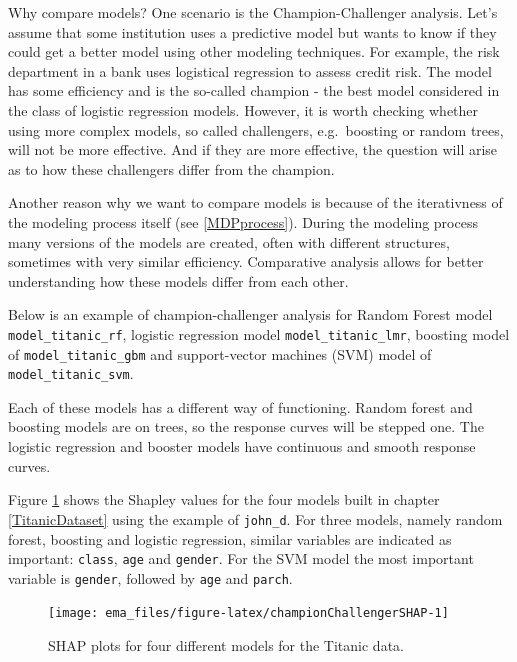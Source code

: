 \documentclass[12pt,]{krantz}
\begin{document}
Why compare models?
One scenario is the Champion-Challenger analysis. Let's assume that some institution uses a predictive model but wants to know if they could get a better model using other modeling techniques. For example, the risk department in a bank uses logistical regression to assess credit risk. The model has some efficiency and is the so-called champion - the best model considered in the class of logistic regression models.
However, it is worth checking whether using more complex models, so called challengers, e.g.~boosting or random trees, will not be more effective. And if they are more effective, the question will arise as to how these challengers differ from the champion.

Another reason why we want to compare models is because of the iterativness of the modeling process itself (see \ref{MDPprocess}). During the modeling process many versions of the models are created, often with different structures, sometimes with very similar efficiency. Comparative analysis allows for better understanding how these models differ from each other.

Below is an example of champion-challenger analysis for Random Forest model \texttt{model\_titanic\_rf}, logistic regression model \texttt{model\_titanic\_lmr}, boosting model of \texttt{model\_titanic\_gbm} and support-vector machines (SVM) model of \texttt{model\_titanic\_svm}.

Each of these models has a different way of functioning. Random forest and boosting models are on trees, so the response curves will be stepped one. The logistic regression and booster models have continuous and smooth response curves.

Figure \ref{fig:championChallengerSHAP} shows the Shapley values for the four models built in chapter \ref{TitanicDataset} using the example of \texttt{john\_d}. For three models, namely random forest, boosting and logistic regression, similar variables are indicated as important: \texttt{class}, \texttt{age} and \texttt{gender}. For the SVM model the most important variable is \texttt{gender}, followed by \texttt{age} and \texttt{parch}.

\begin{figure}

{\centering \texttt{[image: ema\_files/figure-latex/championChallengerSHAP-1]} 

}

\caption{SHAP plots for four different models for the Titanic data.}\label{fig:championChallengerSHAP}
\end{figure}
\end{document}

